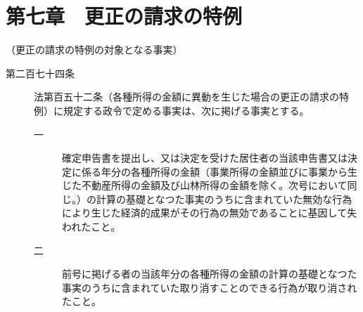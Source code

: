 \documentclass[twocolumn,a4j,10pt]{ltjtarticle}
\begin{document}
\section*{第七章　更正の請求の特例}
\noindent\hspace{10pt}（更正の請求の特例の対象となる事実）
\begin{description}
\item[第二百七十四条]法第百五十二条（各種所得の金額に異動を生じた場合の更正の請求の特例）に規定する政令で定める事実は、次に掲げる事実とする。
\begin{description}
\item[一]確定申告書を提出し、又は決定を受けた居住者の当該申告書又は決定に係る年分の各種所得の金額（事業所得の金額並びに事業から生じた不動産所得の金額及び山林所得の金額を除く。次号において同じ。）の計算の基礎となつた事実のうちに含まれていた無効な行為により生じた経済的成果がその行為の無効であることに基因して失われたこと。
\item[二]前号に掲げる者の当該年分の各種所得の金額の計算の基礎となつた事実のうちに含まれていた取り消すことのできる行為が取り消されたこと。
\end{description}
\end{description}
\end{document}
